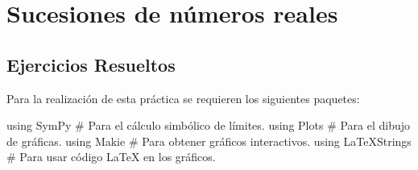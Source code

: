 \documentclass[
  a4paper,
]{scrreport}
\newenvironment{Shaded}{\begin{snugshade}}{\end{snugshade}}
\newcommand{\BuiltInTok}[1]{\textcolor[rgb]{0.00,0.23,0.31}{#1}}
\newcommand{\CommentTok}[1]{\textcolor[rgb]{0.37,0.37,0.37}{#1}}
\newcommand{\ImportTok}[1]{\textcolor[rgb]{0.00,0.46,0.62}{#1}}
\theoremstyle{definition}
\theoremstyle{remark}
\begin{document}

\hypertarget{sucesiones-de-nuxfameros-reales}{%
\chapter{Sucesiones de números
reales}\label{sucesiones-de-nuxfameros-reales}}

\hypertarget{ejercicios-resueltos}{%
\section{Ejercicios Resueltos}\label{ejercicios-resueltos}}

Para la realización de esta práctica se requieren los siguientes
paquetes:

\begin{Shaded}
\begin{Highlighting}[]
\ImportTok{using} \BuiltInTok{SymPy  }\CommentTok{\# Para el cálculo simbólico de límites.}
\ImportTok{using} \BuiltInTok{Plots  }\CommentTok{\# Para el dibujo de gráficas.}
\ImportTok{using} \BuiltInTok{Makie }\CommentTok{\# Para obtener gráficos interactivos.}
\ImportTok{using} \BuiltInTok{LaTeXStrings  }\CommentTok{\# Para usar código LaTeX en los gráficos.}
\end{Highlighting}
\end{Shaded}
\end{document}
